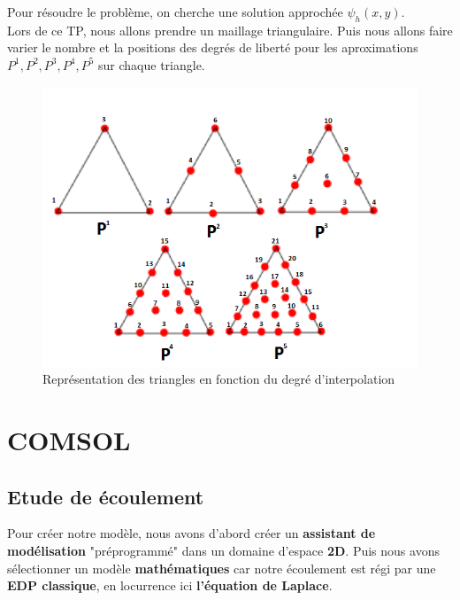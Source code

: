 \documentclass[a4paper,11pt]{report} %
\begin{document}
Pour résoudre le problème, on cherche une solution approchée $\psi_h(x,y)$.
\\
Lors de ce TP, nous allons prendre un maillage triangulaire.
Puis nous allons faire varier le nombre et la positions des degrés de liberté pour les aproximations $P^1, P^2, P^3, P^4, P^5$ sur chaque triangle.
\pagebreak
\begin{figure}[!h]
\centering
\hspace*{0mm}\vfill
\begin{center} \includegraphics{triangle.png} \end{center}
\vfill\hspace*{0mm}
\caption{Représentation des triangles en fonction du degré d'interpolation}
\label{Tux}
\end{figure}


\section{COMSOL}

\subsection{Etude de écoulement}

Pour créer notre modèle, nous avons d'abord créer un \textbf{assistant de modélisation} "préprogrammé" dans un domaine d'espace \textbf{2D}. Puis nous avons sélectionner un modèle \textbf{mathématiques} car notre écoulement est régi par une \textbf{EDP classique}, en locurrence ici \textbf{l'équation de Laplace}.\\
\end{document}
